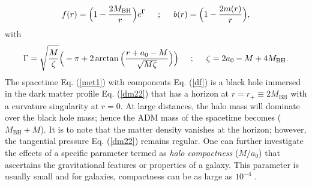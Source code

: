 \documentclass[11pt]{article}
\begin{document}
\begin{align}\label{df}
     f(r) = \Big(1-\frac{2M_{\textrm{BH}}}{r}\Big) e^{\Gamma} \hspace{5mm} ; \hspace{5mm}
     b(r) = \Big(1-\frac{2m(r)}{r}\Big),
 \end{align}
 with
\begin{align} \label{cmp1}
    \Gamma = \sqrt{\frac{M}{\zeta}}\Big(-\pi+2\arctan\Big(\frac{r+a_{0}-M}{\sqrt{M\zeta}}\Big)\Big) \hspace{5mm} ; \hspace{5mm}
    \zeta = 2a_{0}-M+4M_{\textrm{BH}}. 
\end{align}
The spacetime Eq. (\ref{met1}) with components Eq. (\ref{df}) is a black hole immersed in the dark matter profile Eq. (\ref{dm22}) that has a horizon at $r=r_+\equiv 2M_{\textrm{BH}}$ with a curvature singularity  at $r=0$. At large distances, the halo mass will dominate over the black hole mass; hence the ADM mass of the spacetime becomes ($M_{\textrm{BH}}+M$). It is to note that the matter density vanishes at the horizon; however, the tangential pressure Eq. (\ref{dm22}) remains regular. %
One can further investigate the effects of a specific parameter termed as \textit{halo compactness} ($M/a_{0}$) that ascertains the gravitational features or properties of a galaxy. This parameter is usually small and for galaxies, compactness can be as large as $10^{-4}$ \cite{Navarro:1995iw}.

\end{document}
